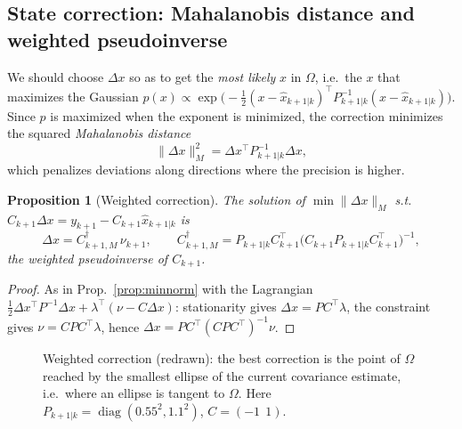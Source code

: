 \documentclass[11pt,a4paper]{article}
\def\boldsymbol#1{#1}%
\def\mathbf#1{#1}%
\DeclareMathOperator{\diag}{diag}
\newcommand{\tp}{^{\top}}
\newcommand{\pinv}{^{\dagger}}
\newcommand{\hx}{\hat{\boldsymbol{x}}}
\newcommand{\bx}{\boldsymbol{x}}
\newcommand{\by}{\boldsymbol{y}}
\newcommand{\bnu}{\boldsymbol{\nu}}
\newcommand{\mC}{\mathbf{C}}
\newcommand{\mP}{\mathbf{P}}
\theoremstyle{definition}
\theoremstyle{plain}
\newtheorem{proposition}[definition]{Proposition}
\theoremstyle{remark}
\begin{document}
\subsection{State correction: Mahalanobis distance and weighted pseudoinverse}

We should choose $\Delta\bx$ so as to get the \emph{most likely} $\bx$ in $\Omega$, i.e.\ the $\bx$ that maximizes the Gaussian
$p(\bx)\propto\exp\!\big(-\tfrac12(\bx-\hx_{k+1|k})\tp\mP_{k+1|k}^{-1}(\bx-\hx_{k+1|k})\big)$. Since $p$ is maximized when the exponent is
minimized, the correction minimizes the squared \emph{Mahalanobis distance}
\begin{equation}
\|\Delta\bx\|_M^2=\Delta\bx\tp\mP_{k+1|k}^{-1}\Delta\bx ,
\end{equation}
which penalizes deviations along directions where the precision is higher.

\begin{proposition}[Weighted correction]\label{prop:weighted}
The solution of $\min\|\Delta\bx\|_M$ s.t.\ $\mC_{k+1}\Delta\bx=\by_{k+1}-\mC_{k+1}\hx_{k+1|k}$ is
\begin{equation}\label{eq:dxM}
\Delta\bx=\mC_{k+1,M}\pinv\,\bnu_{k+1},\qquad
\mC_{k+1,M}\pinv=\mP_{k+1|k}\mC_{k+1}\tp\big(\mC_{k+1}\mP_{k+1|k}\mC_{k+1}\tp\big)^{-1},
\end{equation}
the \emph{weighted pseudoinverse} of $\mC_{k+1}$.
\end{proposition}
\begin{proof}
As in Prop.~\ref{prop:minnorm} with the Lagrangian $\tfrac12\Delta\bx\tp\mP^{-1}\Delta\bx+\boldsymbol\lambda\tp(\bnu-\mC\Delta\bx)$:
stationarity gives $\Delta\bx=\mP\mC\tp\boldsymbol\lambda$, the constraint gives $\bnu=\mC\mP\mC\tp\boldsymbol\lambda$, hence
$\Delta\bx=\mP\mC\tp(\mC\mP\mC\tp)^{-1}\bnu$.
\end{proof}

\begin{figure}[H]
\centering
{}
\caption{Weighted correction (redrawn): the best correction is the point of $\Omega$ reached by the smallest ellipse of the
current covariance estimate, i.e.\ where an ellipse is tangent to $\Omega$. Here $\mP_{k+1|k}=\diag(0.55^2,1.1^2)$, $\mC=(-1\ \ 1)$.}\label{fig:weighted}
\end{figure}
\end{document}
